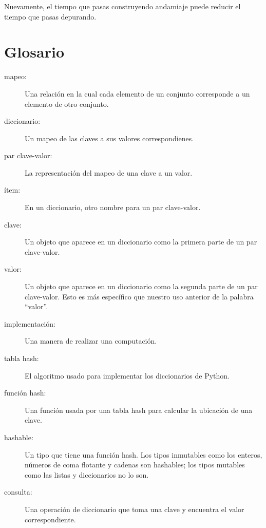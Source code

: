 \documentclass[10pt]{book}
\begin{document}
Nuevamente, el tiempo que pasas construyendo andamiaje puede reducir
el tiempo que pasas depurando.


\section{Glosario}

\begin{description}

\item[mapeo:] Una relación en la cual cada elemento de un conjunto
corresponde a un elemento de otro conjunto.

\item[diccionario:] Un mapeo de las claves a sus
valores correspondienes.

\item[par clave-valor:] La representación del mapeo de
una clave a un valor.

\item[ítem:] En un diccionario, otro nombre para un par
clave-valor.

\item[clave:] Un objeto que aparece en un diccionario como la
primera parte de un par clave-valor.

\item[valor:] Un objeto que aparece en un diccionario como la
segunda parte de un par clave-valor.  Esto es más específico que
nuestro uso anterior de la palabra ``valor''.

\item[implementación:] Una manera de realizar una computación.

\item[tabla hash:] El algoritmo usado para implementar los
diccionarios de Python.

\item[función hash:] Una función usada por una tabla hash para calcular
la ubicación de una clave.

\item[hashable:] Un tipo que tiene una función hash.  Los tipos inmutables
como los enteros, números de
coma flotante y cadenas son hashables; los tipos mutables como las listas y
diccionarios no lo son.

\item[consulta:] Una operación de diccionario que toma una clave y encuentra
el valor correspondiente.


\end{description}
\end{document}
